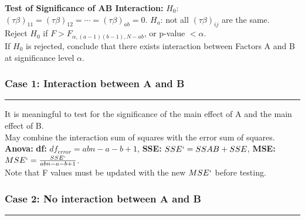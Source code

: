 \documentclass[10pt]{article}
\begin{document}
    \textbf{Test of Significance of AB Interaction: }
    $H_0$: $(\tau \beta)_{11} = (\tau \beta)_{12} = \cdots = (\tau \beta)_{ab} = 0$.
    $H_a$: not all $(\tau \beta)_{ij}$ are the same. \\
    Reject $H_0$ if $F > F_{\alpha, (a-1)(b-1), N - ab}$, or p-value $< \alpha$. \\
    If $H_0$ is rejected, conclude that there exists interaction between Factors A and B at significance level $\alpha$.
    \subsubsection*{Case 1: Interaction between A and B}
    \hrule width 8cm
    \vspace{6pt}
    It is meaningful to test for the significance of the main effect of A and the main effect of B. \\
    May combine the interaction sum of squares with the error sum of squares. \\
    \textbf{Anova: } \textbf{df: }$df_{error} = abn - a - b + 1$, \textbf{SSE: }$SSE` = SSAB + SSE$, \textbf{MSE: }$MSE` = \frac{SSE`}{abn - a - b + 1}$. \\
    Note that F values must be updated with the new $MSE`$ before testing.
    \subsubsection*{Case 2: No interaction between A and B}
    \hrule width 8cm
    \vspace{6pt}
  
  
  
\end{document}

